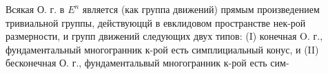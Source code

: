 \documentclass[10pt]{article}
\begin{document}
Всякая О. г. в $E^{n}$ является (как группа движений) прямым произведением тривиальной группы, действуюццй в евклидовом пространстве нек-рой размерности, и групп движений следующих двух типов: (I) конечная O. г., фундаментальный многогранник к-рой есть симплициальный конус, и (II) бесконечная О. г., фундаментальвый многогранник к-рой есть сим-
\end{document}
